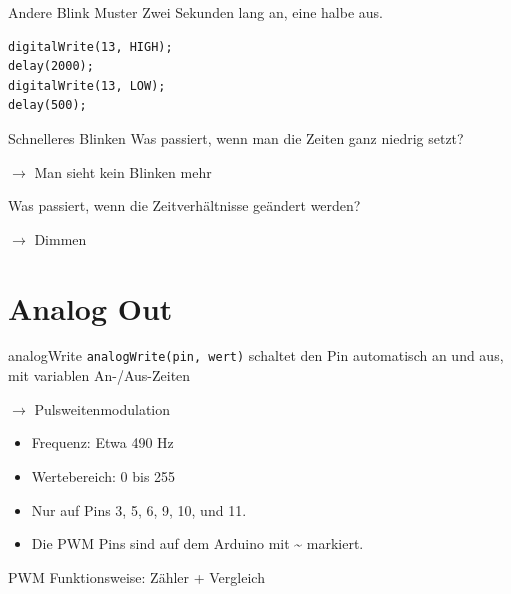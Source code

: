 \documentclass[bigger]{beamer}
\begin{document}
\begin{frame}[fragile,label={sec:org98a61ed}]{Andere Blink Muster}
 Zwei Sekunden lang an, eine halbe aus.

\pause

\begin{verbatim}
digitalWrite(13, HIGH);
delay(2000);
digitalWrite(13, LOW);
delay(500);
\end{verbatim}
\end{frame}

\begin{frame}[label={sec:org2e13a69}]{Schnelleres Blinken}
Was passiert, wenn man die Zeiten ganz niedrig setzt?
\pause

\(\rightarrow\) Man sieht kein Blinken mehr
\pause

Was passiert, wenn die Zeitverhältnisse geändert werden?
\pause

\(\rightarrow\) Dimmen
\end{frame}

\section{Analog Out}
\label{sec:org8757b56}
\begin{frame}[fragile,label={sec:orgcbd566f}]{analogWrite}
 \texttt{analogWrite(pin, wert)} schaltet den Pin automatisch an und aus, mit
variablen An-/Aus-Zeiten 

\(\rightarrow\) Pulsweitenmodulation

\begin{itemize}
\item Frequenz: Etwa 490 Hz
\item Wertebereich: 0 bis 255
\item Nur auf Pins 3, 5, 6, 9, 10, und 11.
\item Die PWM Pins sind auf dem Arduino mit \textasciitilde{} markiert.
\end{itemize}
\end{frame}

\begin{frame}[label={sec:orgab088ef}]{PWM Funktionsweise: Zähler + Vergleich}
\end{frame}
\end{document}
